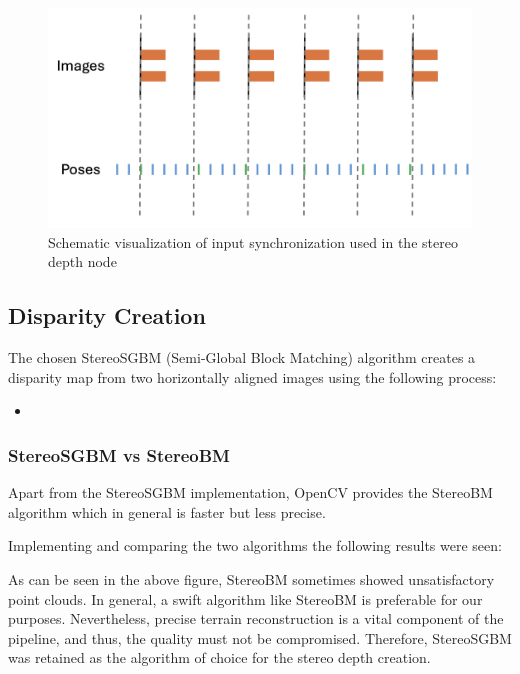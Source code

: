 \begin{figure}[h]
\centering
\includegraphics[scale=0.3]{images/stereo_camera_depth/input_synchronization.png}
\caption{Schematic visualization of input synchronization used in the stereo depth node}
\label{fig:input_synch}
\end{figure}

\subsection{Disparity Creation}\label{subsec:disparity_creation}

The chosen StereoSGBM (Semi-Global Block Matching) algorithm creates a disparity map from two horizontally aligned images using the following process:

\begin{itemize}
    \item 
\end{itemize}


\subsubsection{StereoSGBM vs StereoBM}\label{subsec:bmvssgbm}

Apart from the StereoSGBM implementation, OpenCV provides the StereoBM algorithm which in general is faster but less precise.

Implementing and comparing the two algorithms the following results were seen:


As can be seen in the above figure, StereoBM sometimes showed unsatisfactory point clouds. In general, a swift algorithm like StereoBM is preferable for our purposes. Nevertheless, precise terrain reconstruction is a vital component of the pipeline, and thus, the quality must not be compromised. Therefore, StereoSGBM was retained as the algorithm of choice for the stereo depth creation.

